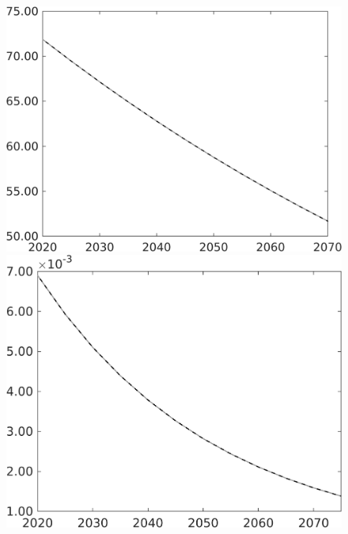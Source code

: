 \documentclass[12pt]{article}
\begin{document}
\begin{figure}[h!!]
\begin{minipage}[]{0.32\textwidth}
		\end{minipage}	
		\begin{minipage}[]{0.32\textwidth}
			\includegraphics[width=1\textwidth]{../../codding_model/own_basedOnFried/optimalPol_010922_revision/figures/all_13Sept22/CompTaul_LFBAU_Reg0_gAf_spillover0_nsk1_xgr0_knspil1_sep1_countec0_GovRev0_etaa0.79_lgd0.png}
		\end{minipage}	
		\begin{minipage}[]{0.32\textwidth}
			\includegraphics[width=1\textwidth]{../../codding_model/own_basedOnFried/optimalPol_010922_revision/figures/all_13Sept22/CompTaul_Equlab_LFBAU_Reg0_AgAf_spillover0_nsk1_xgr0_knspil1_sep1_countec0_GovRev0_etaa0.79_lgd0.png}

\end{minipage}
\end{figure}
\end{document}
